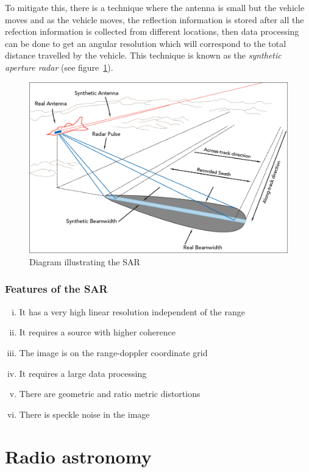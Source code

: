 To mitigate this, there is a technique where the antenna is small but the vehicle moves and as the vehicle moves, the reflection information is stored after all the refection information is collected from different locations, then data processing can be done to get an angular resolution which will correspond to the total distance travelled by the vehicle. This technique is known as the \textit{synthetic aperture radar} (see figure~\ref{fig:sar2}).
\begin{figure}[h]
\centering
\includegraphics[scale=0.3]{./graphics/sar2}
\caption{Diagram illustrating the SAR}
\label{fig:sar2}
\end{figure}

\subsubsection*{Features of the SAR}
\begin{enumerate}[(i)]
\item It has a very high linear resolution independent of the range
\item It requires a source with higher coherence
\item The image is on the range-doppler coordinate grid
\item It requires a large data processing
\item There are geometric and ratio metric distortions
\item There is speckle noise in the image
\end{enumerate}

\section{Radio astronomy} 

